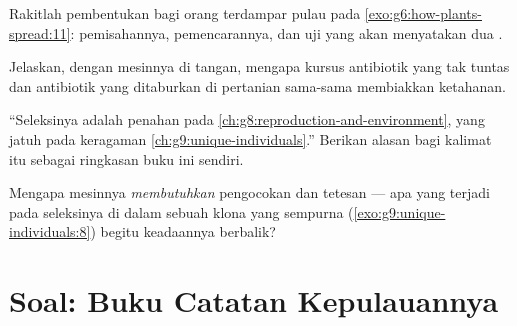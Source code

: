 \begin{exercise}[$\star\star$]\label{exo:g9:how-species-change:9}
Rakitlah pembentukan  bagi orang terdampar pulau pada
\cref{exo:g6:how-plants-spread:11}: pemisahannya,
pemencarannya, dan uji yang akan menyatakan dua .
\end{exercise}

\begin{exercise}[$\star\star$]\label{exo:g9:how-species-change:10}
Jelaskan, dengan mesinnya di tangan, mengapa kursus
antibiotik yang tak tuntas dan antibiotik yang ditaburkan di
pertanian sama-sama membiakkan ketahanan.
\end{exercise}

\begin{exercise}[$\star\star$]\label{exo:g9:how-species-change:11}
``Seleksinya adalah penahan pada
\cref{ch:g8:reproduction-and-environment}, yang jatuh pada
keragaman \cref{ch:g9:unique-individuals}.'' Berikan alasan
bagi kalimat itu sebagai ringkasan buku ini sendiri.
\end{exercise}

\begin{exercise}[$\star\star\star$]\label{exo:g9:how-species-change:12}
Mengapa mesinnya \emph{membutuhkan} pengocokan  dan tetesan  --- apa yang terjadi pada
seleksinya di dalam sebuah  klona yang sempurna
(\cref{exo:g9:unique-individuals:8}) begitu keadaannya
berbalik?
\end{exercise}

\section{Soal: Buku Catatan Kepulauannya}

